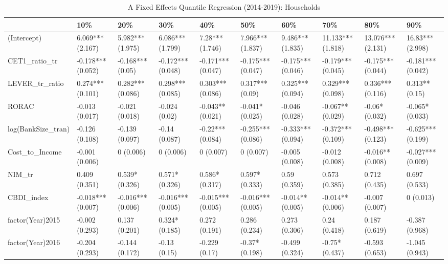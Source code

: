 \begin{table}[ht]
\centering
\caption{A Fixed Effects Quantile Regression (2014-2019): Households} 
\begingroup\small
\begin{tabular}{llllllllll}
  \toprule
 & 10\% & 20\% & 30\% & 40\% & 50\% & 60\% & 70\% & 80\% & 90\% \\ 
  \midrule
(Intercept) & 6.069*** (2.167) & 5.982*** (1.975) & 6.086*** (1.799) & 7.28*** (1.746) & 7.966*** (1.837) & 9.486*** (1.835) & 11.133*** (1.818) & 13.076*** (2.131) & 16.83*** (2.998) \\ 
  CET1\_ratio\_tr & -0.178*** (0.052) & -0.168*** (0.05) & -0.172*** (0.048) & -0.171*** (0.047) & -0.175*** (0.047) & -0.175*** (0.046) & -0.179*** (0.045) & -0.175*** (0.044) & -0.181*** (0.042) \\ 
  LEVER\_tr\_ratio & 0.274*** (0.101) & 0.282*** (0.086) & 0.298*** (0.085) & 0.303*** (0.086) & 0.317*** (0.09) & 0.325*** (0.094) & 0.329*** (0.098) & 0.336*** (0.116) & 0.313** (0.15) \\ 
  RORAC & -0.013 (0.017) & -0.021 (0.018) & -0.024 (0.02) & -0.043** (0.021) & -0.041* (0.025) & -0.046 (0.028) & -0.067** (0.029) & -0.06* (0.032) & -0.065* (0.033) \\ 
  log(BankSize\_tran) & -0.126 (0.108) & -0.139 (0.097) & -0.14 (0.087) & -0.22*** (0.084) & -0.255*** (0.086) & -0.333*** (0.094) & -0.372*** (0.109) & -0.498*** (0.123) & -0.625*** (0.199) \\ 
  Cost\_to\_Income & -0.001 (0.006) & 0 (0.006) & 0 (0.006) & 0 (0.007) & 0 (0.007) & -0.005 (0.008) & -0.012 (0.008) & -0.016** (0.008) & -0.027*** (0.009) \\ 
  NIM\_tr & 0.409 (0.351) & 0.539* (0.326) & 0.571* (0.326) & 0.586* (0.317) & 0.597* (0.333) & 0.59 (0.359) & 0.573 (0.385) & 0.712 (0.435) & 0.697 (0.533) \\ 
  CBDI\_index & -0.018*** (0.007) & -0.016*** (0.006) & -0.016*** (0.005) & -0.015*** (0.005) & -0.016*** (0.005) & -0.014** (0.005) & -0.014** (0.006) & -0.007 (0.007) & 0 (0.013) \\ 
  factor(Year)2015 & -0.002 (0.293) & 0.137 (0.201) & 0.324* (0.185) & 0.272 (0.191) & 0.286 (0.234) & 0.273 (0.306) & 0.24 (0.418) & 0.187 (0.619) & -0.387 (0.968) \\ 
  factor(Year)2016 & -0.204 (0.293) & -0.144 (0.172) & -0.13 (0.15) & -0.229 (0.17) & -0.37* (0.198) & -0.499 (0.324) & -0.75* (0.437) & -0.593 (0.653) & -1.045 (0.943) \\ 

\end{tabular}
\end{table}
